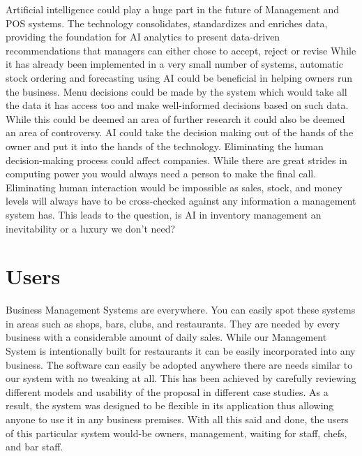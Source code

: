 Artificial intelligence could play a huge part in the future of Management and POS systems. The technology consolidates, standardizes and enriches data, providing the foundation for AI analytics to present data-driven recommendations that managers can either chose to accept, reject or revise\cite{AI}
\newline
 While it has already been implemented in a very small number of systems, automatic stock ordering and forecasting using AI could be beneficial in helping owners run the business. Menu decisions could be made by the system which would take all the data it has access too and make well-informed decisions based on such data.
\newline
\newline
While this could be deemed an area of further research it could also be deemed an area of controversy. AI could take the decision making out of the hands of the owner and put it into the hands of the technology. Eliminating the human decision-making process could affect companies. While there are great strides in computing power you would always need a person to make the final call. Eliminating human interaction would be impossible as sales, stock, and money levels will always have to be cross-checked against any information a management system has. This leads to the question, is AI in inventory management an inevitability or a luxury we don’t need?

\section{Users}

Business Management Systems are everywhere. You can easily spot these systems in areas such as shops, bars, clubs, and restaurants. They are needed by every business with a considerable amount of daily sales. While our Management System is intentionally built for restaurants it can be easily incorporated into any business. The software can easily be adopted anywhere there are needs similar to our system with no tweaking at all. This has been achieved by carefully reviewing different models and usability of the proposal in different case studies.
\newline
\newline
As a result, the system was designed to be flexible in its application thus allowing anyone to use it in any business premises. With all this said and done, the users of this particular system would-be owners, management, waiting for staff, chefs, and bar staff.

